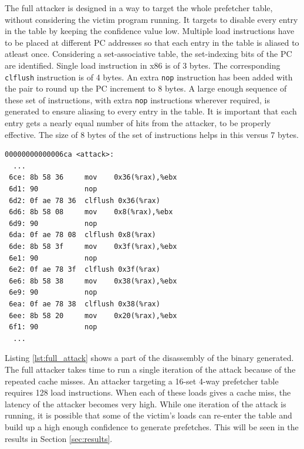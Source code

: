 \documentclass[conference]{IEEEtran}
\begin{document}
The full attacker is designed in a way to target the whole prefetcher table,
without considering the victim program running. It targets to disable every
entry in the table by keeping the confidence value low.
Multiple load instructions have to be placed at different PC addresses
so that each entry in the table is aliased to atleast once.
Considering a set-associative table, the set-indexing bits of the PC
are identified.
Single load instruction in x86 is of 3 bytes. The corresponding \texttt{clflush}
instruction is of 4 bytes. An extra \texttt{nop} instruction has been added
with the pair to round up the PC increment to 8 bytes.
A large enough sequence of these set of instructions, with extra \texttt{nop}
instructions wherever required, is generated to ensure aliasing
to every entry in the table. It is important that each entry gets a nearly
equal number of hits from the attacker, to be properly effective. The size of
8 bytes of the set of instructions helps in this versus 7 bytes.

\begin{lstlisting}[caption={Full Attacker disassembly: load misses at different PCs},
label={lst:full_attack}]
00000000000006ca <attack>:
  ...
 6ce: 8b 58 36     mov    0x36(%rax),%ebx
 6d1: 90           nop
 6d2: 0f ae 78 36  clflush 0x36(%rax)
 6d6: 8b 58 08     mov    0x8(%rax),%ebx
 6d9: 90           nop
 6da: 0f ae 78 08  clflush 0x8(%rax)
 6de: 8b 58 3f     mov    0x3f(%rax),%ebx
 6e1: 90           nop
 6e2: 0f ae 78 3f  clflush 0x3f(%rax)
 6e6: 8b 58 38     mov    0x38(%rax),%ebx
 6e9: 90           nop
 6ea: 0f ae 78 38  clflush 0x38(%rax)
 6ee: 8b 58 20     mov    0x20(%rax),%ebx
 6f1: 90           nop
  ...
\end{lstlisting}

Listing \ref{lst:full_attack} shows a part of the disassembly of the binary
generated.
The full attacker takes time to run a single iteration of the attack
because of the repeated cache misses.
An attacker targeting a 16-set 4-way prefetcher table requires
128 load instructions. When each of these loads gives a cache miss,
the latency of the attacker becomes very high.
While one iteration of the attack is running, it is possible that
some of the victim's loads can re-enter the table and build up a high enough
confidence to generate prefetches. This will be seen in the results in Section
\ref{sec:results}.
\end{document}
